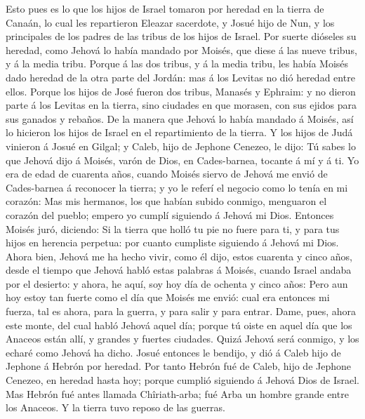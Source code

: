  Esto pues es lo que los hijos de Israel tomaron por heredad
en la tierra de Canaán, lo cual les repartieron Eleazar sacerdote, y
Josué hijo de Nun, y los principales de los padres de las tribus de los
hijos de Israel.  Por suerte dióseles su heredad, como
Jehová lo había mandado por Moisés, que diese á las nueve tribus, y á la
media tribu.  Porque á las dos tribus, y á la media tribu,
les había Moisés dado heredad de la otra parte del Jordán: mas á los
Levitas no dió heredad entre ellos.  Porque los hijos de
José fueron dos tribus, Manasés y Ephraim: y no dieron parte á los
Levitas en la tierra, sino ciudades en que morasen, con sus ejidos para
sus ganados y rebaños.  De la manera que Jehová lo había
mandado á Moisés, así lo hicieron los hijos de Israel en el
repartimiento de la tierra.  Y los hijos de Judá vinieron á
Josué en Gilgal; y Caleb, hijo de Jephone Cenezeo, le dijo: Tú sabes lo
que Jehová dijo á Moisés, varón de Dios, en Cades-barnea, tocante á mí y
á ti.  Yo era de edad de cuarenta años, cuando Moisés siervo
de Jehová me envió de Cades-barnea á reconocer la tierra; y yo le referí
el negocio como lo tenía en mi corazón:  Mas mis hermanos,
los que habían subido conmigo, menguaron el corazón del pueblo; empero
yo cumplí siguiendo á Jehová mi Dios.  Entonces Moisés juró,
diciendo: Si la tierra que holló tu pie no fuere para ti, y para tus
hijos en herencia perpetua: por cuanto cumpliste siguiendo á Jehová mi
Dios.  Ahora bien, Jehová me ha hecho vivir, como él dijo,
estos cuarenta y cinco años, desde el tiempo que Jehová habló estas
palabras á Moisés, cuando Israel andaba por el desierto: y ahora, he
aquí, soy hoy día de ochenta y cinco años:  Pero aun hoy
estoy tan fuerte como el día que Moisés me envió: cual era entonces mi
fuerza, tal es ahora, para la guerra, y para salir y para entrar.
 Dame, pues, ahora este monte, del cual habló Jehová aquel
día; porque tú oiste en aquel día que los Anaceos están allí, y grandes
y fuertes ciudades. Quizá Jehová será conmigo, y los echaré como Jehová
ha dicho.  Josué entonces le bendijo, y dió á Caleb hijo de
Jephone á Hebrón por heredad.  Por tanto Hebrón fué de
Caleb, hijo de Jephone Cenezeo, en heredad hasta hoy; porque cumplió
siguiendo á Jehová Dios de Israel.  Mas Hebrón fué antes
llamada Chîriath-arba; fué Arba un hombre grande entre los Anaceos. Y la
tierra tuvo reposo de las guerras.

